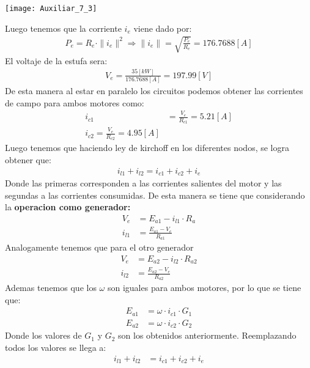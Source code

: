 \documentclass[
  11pt,
  letterpaper,
   addpoints,
   answers
  ]{exam}
\begin{document}
\begin{questions}
\begin{solution}
    \begin{center}
        \texttt{[image: Auxiliar\_7\_3]} \\
    \end{center}
    Luego tenemos que la corriente $i_{e}$ viene dado por:
    \begin{align}
        P_{e} = R_{e} \cdot \|i_{e}\|^{2} \Rightarrow \|i_{e}\| = \sqrt{\frac{P_{e}}{R_{e}}} = 176.7688[A]
    \end{align}
    El voltaje de la estufa sera:
    \begin{align}
        V_{e}= \frac{35[kW]}{176.7688[A]} = 197.99[V]
    \end{align}
    De esta manera al estar en paralelo los circuitos podemos obtener las corrientes de campo para ambos motores como:
    \begin{align}
        i_{c1}&= \frac{V_{e}}{R_{c1}}= 5.21[A]\\
        i_{c2} = \frac{V_{e}}{R_{c2}}= 4.95[A]
    \end{align}
    Luego tenemos que haciendo ley de kirchoff en los diferentes nodos, se logra obtener que:
    \begin{align}
        i_{l1} + i_{l2} = i_{c1} + i_{c2} + i_{e} 
    \end{align}
    Donde las primeras corresponden a las corrientes salientes del motor y las segundas a las corrientes consumidas. De esta manera se tiene que considerando la \textbf{operacion como generador:}
    \begin{align}
        V_{e} &= E_{a1} - i_{l1} \cdot R_{a}\\
        i_{l1} &= \frac{E_{a1}- V_{e}}{R_{a1}}
    \end{align}
    Analogamente tenemos que para el otro generador
    \begin{align}
        V_{e} &= E_{a2} - i_{l2} \cdot R_{a2}\\
        i_{l2} &= \frac{E_{a2}- V_{e}}{R_{a2}}
    \end{align}
    Ademas tenemos que los $\omega$ son iguales para ambos motores, por lo que se tiene que:
    \begin{align}
        E_{a1} &= \omega \cdot i_{c1} \cdot G_{1}\\
        E_{a2} &= \omega \cdot i_{c2} \cdot G_{2}
    \end{align}
    Donde los valores de $G_{1}$ y $G_{2}$ son los obtenidos anteriormente. Reemplazando todos los valores se llega a:
    \begin{align}
        i_{l1} + i_{l2} &= i_{c1} + i_{c2} + i_{e}\\ 

\end{align}
\end{solution}
\end{questions}
\end{document}
